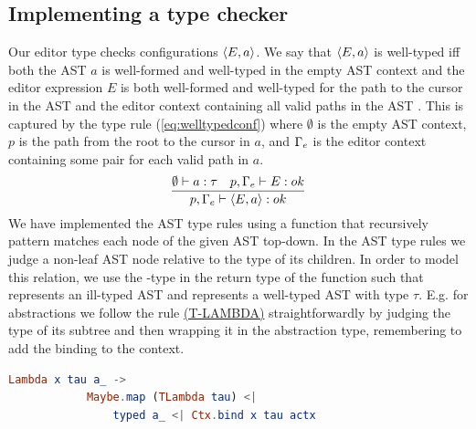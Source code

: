 \subsection{Implementing a type checker}

Our editor type checks configurations $\langle E,a \rangle$. We say that
$\langle E,a \rangle$ is well-typed iff both the AST $a$ is
well-formed and well-typed in the empty AST context and the editor
expression $E$
is both well-formed and well-typed for the path to the cursor in the AST and
the editor context containing all valid paths in the AST \pepm. This
is captured by the type rule
(\ref{eq:welltypedconf}) where $\emptyset$ is the empty AST context, $p$ is the
path from the root to the cursor in $a$, and $\Gamma_{e}$ is the editor context
containing some pair for each valid path in $a$.
%
\begin{equation}\label{eq:welltypedconf}
  \frac{\emptyset \vdash a : \tau \quad p,\Gamma_{e} \vdash E : ok} {p,\Gamma_{e} \vdash \langle E,a \rangle : ok}\\ 
\end{equation}
%
We have implemented the AST type rules using a function that recursively
pattern matches each node of the given AST top-down. In the AST type rules we
judge a non-leaf AST node relative to the type of its children. In order to
model this relation, we use the -type in the return type of the
function such that  represents an ill-typed AST and  represents a well-typed AST with type $\tau$. E.g. for abstractions we
follow the rule \hyperref[fig:asttyperules]{(T-LAMBDA)} straightforwardly by
judging the type of its subtree and then wrapping it in the abstraction type,
remembering to add the binding to the context.

\begin{lstlisting}[language=elm,%
                    gobble=8,%
                    mathescape,%
                    ]
        Lambda x tau a_ ->
            Maybe.map (TLambda tau) <|
                typed a_ <| Ctx.bind x tau actx
\end{lstlisting}

